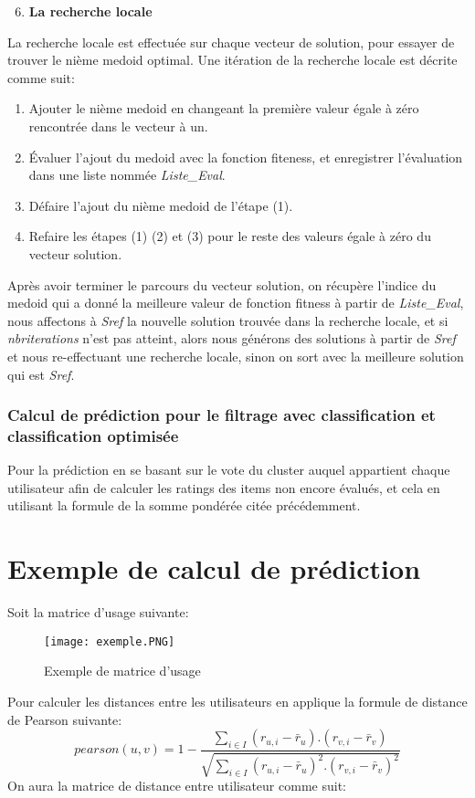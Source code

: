 \begin{enumerate}[nosep,label=\textbf{\arabic*)}]
	\setcounter{enumi}{5}
	\item \textbf{La recherche locale}
\end{enumerate}\mbox{}\indent La recherche locale est effectuée sur chaque vecteur de solution, pour essayer de trouver le nième medoid optimal. 
Une itération de la recherche locale est décrite comme suit:
\begin{enumerate}
	\item Ajouter le nième medoid en changeant la première valeur égale à zéro rencontrée dans le vecteur à un.
	\item Évaluer l'ajout du medoid avec la fonction fiteness, et enregistrer l'évaluation dans une liste nommée \textit{Liste{\_}Eval}.
	\item Défaire l'ajout du nième medoid de l'étape (1).
	\item Refaire les étapes  (1) (2) et (3) pour le reste des valeurs égale à zéro du vecteur solution.
\end{enumerate}
\indent Après avoir terminer le parcours du vecteur solution, on récupère l'indice du medoid qui a donné la meilleure valeur de fonction fitness à partir de \textit{Liste{\_}Eval}, nous affectons à \textit{Sref} la nouvelle solution trouvée dans la recherche locale, et si \textit{nbriterations} n'est pas atteint, alors nous générons des solutions à partir de \textit{Sref} et nous re-effectuant une recherche locale, sinon on sort avec la meilleure solution qui est \textit{Sref}.

\subsubsection*{Calcul de prédiction pour le filtrage avec classification et classification optimisée}Pour la prédiction en se basant sur le vote du cluster auquel appartient chaque utilisateur afin de calculer les ratings des items non encore évalués, et cela en utilisant la formule de la somme pondérée citée précédemment.

\section{Exemple de calcul de prédiction}
Soit la matrice d'usage suivante:
\begin{figure}[H]
	\centering
	\texttt{[image: exemple.PNG]}
	\caption{Exemple de matrice d'usage}
	\label{fig:exemple}
\end{figure}
Pour calculer les distances entre les utilisateurs en applique la formule de distance de Pearson suivante:
\begin{equation}
pearson(u,v)= 1 - \frac{\sum_{i \in I} (r_{u,i}-\bar{r}_{u}).(r_{v,i}-\bar{r}_{v})}{\sqrt{\sum_{i \in I} (r_{u,i}-\bar{r}_{u})^{2}.(r_{v,i}-\bar{r}_{v})^{2}}}
\end{equation}
On aura la matrice de distance entre utilisateur comme suit:

